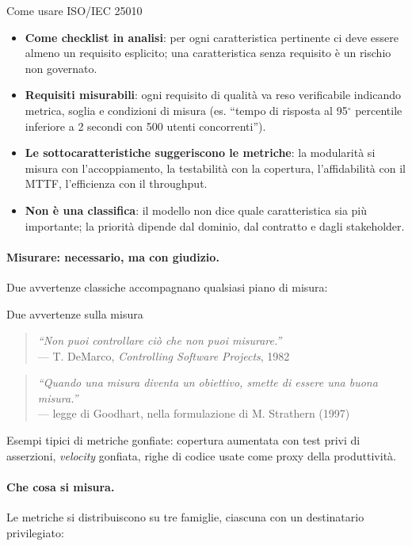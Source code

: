 \documentclass[12pt]{extarticle}
\begin{document}
\begin{cbox}{Come usare ISO/IEC 25010}
\begin{itemize}
    \item \textbf{Come checklist in analisi}: per ogni caratteristica pertinente ci deve essere almeno un requisito esplicito; una caratteristica senza requisito è un rischio non governato.
    \item \textbf{Requisiti misurabili}: ogni requisito di qualità va reso verificabile indicando metrica, soglia e condizioni di misura (es. ``tempo di risposta al 95$^\circ$ percentile inferiore a 2 secondi con 500 utenti concorrenti'').
    \item \textbf{Le sottocaratteristiche suggeriscono le metriche}: la modularità si misura con l'accoppiamento, la testabilità con la copertura, l'affidabilità con il MTTF, l'efficienza con il throughput.
    \item \textbf{Non è una classifica}: il modello non dice quale caratteristica sia più importante; la priorità dipende dal dominio, dal contratto e dagli stakeholder.
\end{itemize}
\end{cbox}

\paragraph{Misurare: necessario, ma con giudizio.}
Due avvertenze classiche accompagnano qualsiasi piano di misura:

\begin{cbox}{Due avvertenze sulla misura}
\begin{quote}
\textit{``Non puoi controllare ciò che non puoi misurare.''}\\
--- T. DeMarco, \textit{Controlling Software Projects}, 1982
\end{quote}
\begin{quote}
\textit{``Quando una misura diventa un obiettivo, smette di essere una buona misura.''}\\
--- legge di Goodhart, nella formulazione di M. Strathern (1997)
\end{quote}
\noindent Esempi tipici di metriche gonfiate: copertura aumentata con test privi di asserzioni, \textit{velocity} gonfiata, righe di codice usate come proxy della produttività.
\end{cbox}

\paragraph{Che cosa si misura.}
Le metriche si distribuiscono su tre famiglie, ciascuna con un destinatario privilegiato:
\end{document}
